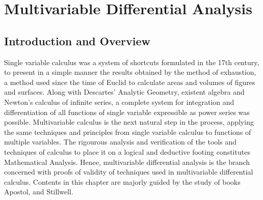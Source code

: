 
\chapter{Multivariable Differential Analysis} %

\label{Chapter1} %


\section{Introduction and Overview}
Single variable calculus was a system of shortcuts formulated in the 17th century,
to present in a simple manner the results obtained by the method of exhaustion, a
method used since the time of Euclid to calculate areas and volumes of figures
and surfaces. Along with Descartes' Analytic Geometry, existent algebra and
Newton's calculus of infinite series, a complete system for integration and
differentiation of all functions of single variable expressible as power series
was possible.\cite{stillwell}
\newline
Multivariable calculus is the next natural step in the process, applying the
same techniques and principles from single variable calculus to functions of
multiple variables.
\newline
The rigourous analysis and verification of the tools and techniques of calculus
to place it on a logical and deductive footing constitutes Mathematical Analysis. Hence,
multivariable differential analysis is the branch concerned with proofs of
validity of techniques used in multivariable differential calculus.
\newline
Contents in this chapter are majorly guided by the study of books
Apostol\cite{apostol}, and Stillwell\cite{stillwell}.

